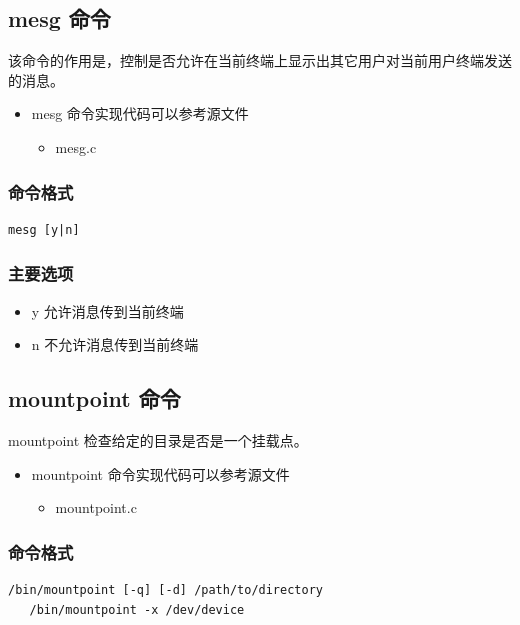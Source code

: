 \subsection{mesg 命令}

该命令的作用是，控制是否允许在当前终端上显示出其它用户对当前用户终端发送的消息。

\begin{itemize}
\item
  mesg 命令实现代码可以参考源文件
  \begin{itemize}
  \item
    mesg.c
  \end{itemize}
\end{itemize}
\subsubsection{命令格式}

{\begin{shaded}\begin{verbatim}
mesg [y|n]
\end{verbatim}\end{shaded}}
\subsubsection{主要选项}

\begin{itemize}
\item
  y 允许消息传到当前终端
\item
  n 不允许消息传到当前终端
\end{itemize}
\subsection{mountpoint 命令}

mountpoint 检查给定的目录是否是一个挂载点。

\begin{itemize}
\item
  mountpoint 命令实现代码可以参考源文件
  \begin{itemize}
  \item
    mountpoint.c
  \end{itemize}
\end{itemize}
\subsubsection{命令格式}

{\begin{shaded}\begin{verbatim}
/bin/mountpoint [-q] [-d] /path/to/directory
   /bin/mountpoint -x /dev/device
\end{verbatim}\end{shaded}}

